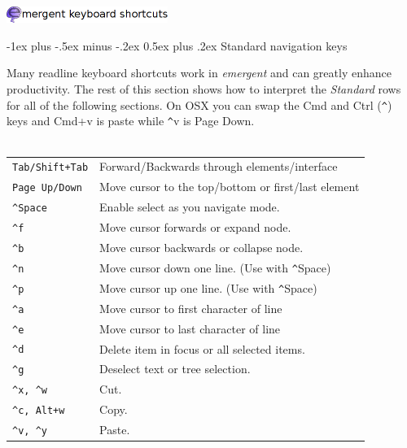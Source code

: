 \documentclass[10pt,landscape]{article}
\makeatletter
\renewcommand{\section}{\@startsection{section}{1}{0mm}%
                                {-1ex plus -.5ex minus -.2ex}%
                                {0.5ex plus .2ex}%
                                {\normalfont\large\bfseries}}
\makeatother
\begin{document}
\raggedright
\footnotesize
\begin{multicols}{3}
\vspace{-5mm}
\begin{center}\includegraphics[width=198.5px]{header.png}\end{center}
\setlength{\premulticols}{1pt}
\setlength{\postmulticols}{1pt}
\setlength{\multicolsep}{1pt}
\setlength{\columnsep}{2pt}

\section{Standard navigation keys}

Many readline keyboard shortcuts work in \textit{emergent} and can
greatly enhance productivity. The rest of this section shows how to
interpret the \textit{Standard} rows for all of the following sections. On OSX
you can swap the Cmd and Ctrl (\verb!^!) keys and Cmd+v is paste while \verb!^!v is
Page Down.\\~\\
\begin{tabular}{@{}ll@{}}
\verb!Tab/Shift+Tab! & Forward/Backwards through elements/interface\\
\verb!Page Up/Down!    & Move cursor to the top/bottom or first/last element\\
\verb!^Space!    & Enable select as you navigate mode.\\
\verb!^f!    & Move cursor forwards or expand node.\\
\verb!^b!    & Move cursor backwards or collapse node.\\
\verb!^n!    & Move cursor down one line. (Use with \verb!^!Space) \\
\verb!^p!    & Move cursor up one line. (Use with \verb!^!Space)\\
\verb!^a!    & Move cursor to first character of line\\
\verb!^e!    & Move cursor to last character of line\\
\verb!^d!  & Delete item in focus or all selected items.\\
\verb!^g!  & Deselect text or tree selection.\\
\verb!^x, ^w! & Cut.\\
\verb!^c, Alt+w! & Copy.\\
\verb!^v, ^y! & Paste.
\end{tabular}


\end{multicols}
\end{document}
